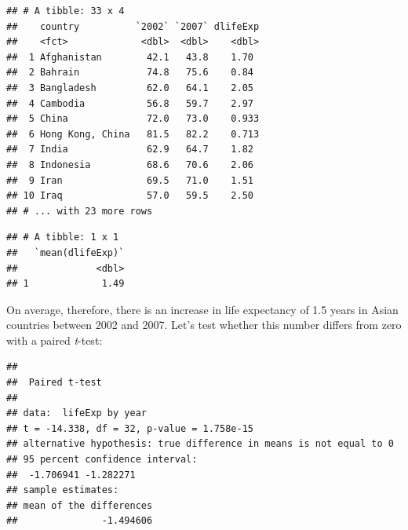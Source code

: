 \documentclass[
  12pt,
  krantz2]{krantz}
\makeatletter
\newenvironment{Shaded}{\begin{snugshade}}{\end{snugshade}}
\newcommand{\CommentTok}[1]{\textcolor[rgb]{0.56,0.35,0.01}{\textit{#1}}}
\newcommand{\DataTypeTok}[1]{\textcolor[rgb]{0.13,0.29,0.53}{#1}}
\newcommand{\KeywordTok}[1]{\textcolor[rgb]{0.13,0.29,0.53}{\textbf{#1}}}
\newcommand{\NormalTok}[1]{#1}
\newcommand{\OperatorTok}[1]{\textcolor[rgb]{0.81,0.36,0.00}{\textbf{#1}}}
\newcommand{\OtherTok}[1]{\textcolor[rgb]{0.56,0.35,0.01}{#1}}
\newcommand{\StringTok}[1]{\textcolor[rgb]{0.31,0.60,0.02}{#1}}
\newenvironment{kframe}{%
\medskip{}
\setlength{\fboxsep}{.8em}
 \def\at@end@of@kframe{}%
 \ifinner\ifhmode%
  \def\at@end@of@kframe{\end{minipage}}%
  \begin{minipage}{\columnwidth}%
 \fi\fi%
 \def\FrameCommand##1{\hskip\@totalleftmargin \hskip-\fboxsep
 \colorbox{shadecolor}{##1}\hskip-\fboxsep
     \hskip-\linewidth \hskip-\@totalleftmargin \hskip\columnwidth}%
 \MakeFramed {\advance\hsize-\width
   \@totalleftmargin\z@ \linewidth\hsize
   \@setminipage}}%
 {\par\unskip\endMakeFramed%
 \at@end@of@kframe}
\renewenvironment{Shaded}{\begin{kframe}}{\end{kframe}}
\makeatother
\begin{document}
\begin{verbatim}
## # A tibble: 33 x 4
##    country          `2002` `2007` dlifeExp
##    <fct>             <dbl>  <dbl>    <dbl>
##  1 Afghanistan        42.1   43.8    1.70 
##  2 Bahrain            74.8   75.6    0.84 
##  3 Bangladesh         62.0   64.1    2.05 
##  4 Cambodia           56.8   59.7    2.97 
##  5 China              72.0   73.0    0.933
##  6 Hong Kong, China   81.5   82.2    0.713
##  7 India              62.9   64.7    1.82 
##  8 Indonesia          68.6   70.6    2.06 
##  9 Iran               69.5   71.0    1.51 
## 10 Iraq               57.0   59.5    2.50 
## # ... with 23 more rows
\end{verbatim}

\begin{Shaded}
\end{Shaded}

\begin{verbatim}
## # A tibble: 1 x 1
##   `mean(dlifeExp)`
##              <dbl>
## 1             1.49
\end{verbatim}

On average, therefore, there is an increase in life expectancy of 1.5 years in Asian countries between 2002 and 2007.
Let's test whether this number differs from zero with a paired \emph{t}-test:

\begin{Shaded}
\end{Shaded}

\begin{verbatim}
## 
##  Paired t-test
## 
## data:  lifeExp by year
## t = -14.338, df = 32, p-value = 1.758e-15
## alternative hypothesis: true difference in means is not equal to 0
## 95 percent confidence interval:
##  -1.706941 -1.282271
## sample estimates:
## mean of the differences 
##               -1.494606
\end{verbatim}
\end{document}
